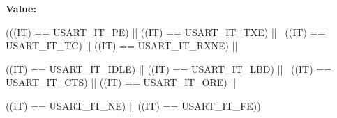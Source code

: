 \label{group__USART__Interrupt__definition_ga9a8014793a383d710eaaf4185f2b795d}
{\bfseries Value:}
\begin{DoxyCode}
(((IT) == USART_IT_PE) || ((IT) == USART_IT_TXE) || \
                            ((IT) == USART_IT_TC) || ((IT) == USART_IT_RXNE) || \
      
                            ((IT) == USART_IT_IDLE) || ((IT) == USART_IT_LBD) || 
      \
                            ((IT) == USART_IT_CTS) || ((IT) == USART_IT_ORE) || \
      
                            ((IT) == USART_IT_NE) || ((IT) == USART_IT_FE))
\end{DoxyCode}
